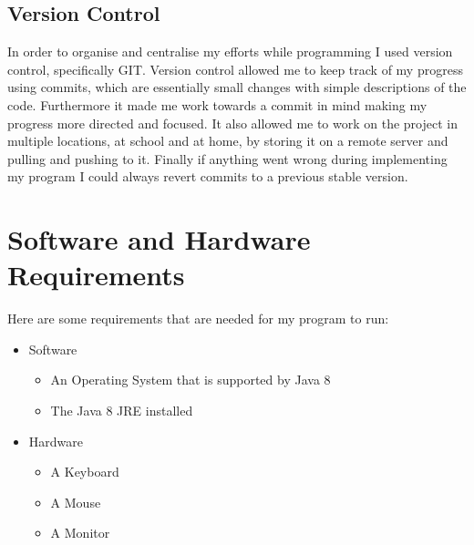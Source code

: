 \documentclass[../../../main.tex]{subfiles}
\begin{document}
\subsection{Version Control}
In order to organise and centralise my efforts while programming I used version control, specifically GIT. Version control allowed me to keep track of my progress using commits, which are essentially small changes with simple descriptions of the code. Furthermore it made me work towards a commit in mind making my progress more directed and focused. It also allowed me to work on the project in multiple locations, at school and at home, by storing it on a remote server and pulling and pushing to it. Finally if anything went wrong during implementing my program I could always revert commits to a previous stable version.

\section{Software and Hardware Requirements}	%
Here are some requirements that are needed for my program to run:
\begin{itemize}
    \item Software
    \begin{itemize}
        \item An Operating System that is supported by Java 8
        \item The Java 8 JRE installed
    \end{itemize}
    \item Hardware
    \begin{itemize}
        \item A Keyboard
        \item A Mouse
        \item A Monitor
    \end{itemize}
\end{itemize}
\end{document}

